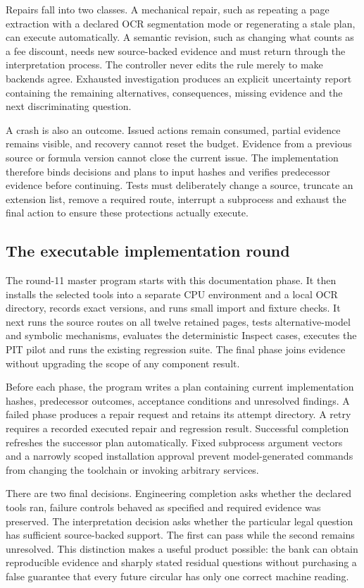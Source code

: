 Repairs fall into two classes. A mechanical repair, such as repeating a page
extraction with a declared OCR segmentation mode or regenerating a stale plan,
can execute automatically. A semantic revision, such as changing what counts as
a fee discount, needs new source-backed evidence and must return through the
interpretation process. The controller never edits the rule merely to make
backends agree. Exhausted investigation produces an explicit uncertainty report
containing the remaining alternatives, consequences, missing evidence and the
next discriminating question.

A crash is also an outcome. Issued actions remain consumed, partial evidence
remains visible, and recovery cannot reset the budget. Evidence from a previous
source or formula version cannot close the current issue. The implementation
therefore binds decisions and plans to input hashes and verifies predecessor
evidence before continuing. Tests must deliberately change a source, truncate
an extension list, remove a required route, interrupt a subprocess and exhaust
the final action to ensure these protections actually execute.

\subsection{The executable implementation round}

The round-11 master program starts with this documentation phase. It then installs
the selected tools into a separate CPU environment and a local OCR directory,
records exact versions, and runs small import and fixture checks. It next runs
the source routes on all twelve retained pages, tests alternative-model and
symbolic mechanisms, evaluates the deterministic Inspect cases, executes the
PIT pilot and runs the existing regression suite. The final phase joins evidence
without upgrading the scope of any component result.

Before each phase, the program writes a plan containing current implementation
hashes, predecessor outcomes, acceptance conditions and unresolved findings. A
failed phase produces a repair request and retains its attempt directory. A
retry requires a recorded executed repair and regression result. Successful
completion refreshes the successor plan automatically. Fixed subprocess argument
vectors and a narrowly scoped installation approval prevent model-generated
commands from changing the toolchain or invoking arbitrary services.

There are two final decisions. Engineering completion asks whether the declared
tools ran, failure controls behaved as specified and required evidence was
preserved. The interpretation decision asks whether the particular legal question
has sufficient source-backed support. The first can pass while the second remains
unresolved. This distinction makes a useful product possible: the bank can obtain
reproducible evidence and sharply stated residual questions without purchasing a
false guarantee that every future circular has only one correct machine reading.

